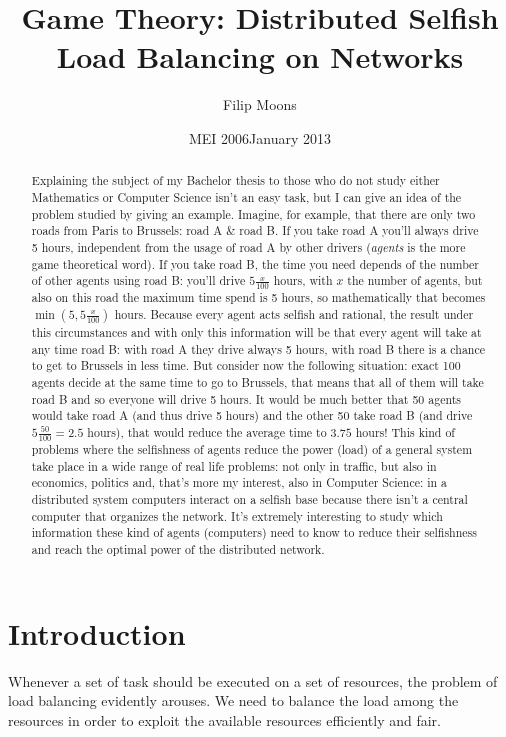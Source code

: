 \documentclass[a4paper,11pt]{article}
\author{Filip Moons}
\title{Game Theory: Distributed Selfish Load Balancing on Networks}
\date{MEI 2006}
\date{January 2013}
\begin{document}
\maketitlepage
\newpage
\null\vspace{\fill}

\begin{abstract}
Explaining the subject of my Bachelor thesis to those who do not study either Mathematics or Computer Science isn't an easy task, but I can give an idea of the problem studied by giving an example. Imagine, for example, that there are only two roads from Paris to Brussels: road A \& road B. If you take road A you'll always drive 5 hours, independent from the usage of road A by other drivers (\emph{agents} is the more game theoretical word). If you take road B, the time you need depends of the number of other agents using road B: you'll drive $5\frac{x}{100}$ hours, with $x$ the number of agents, but also on this road the maximum time spend is 5 hours, so mathematically that becomes $\min(5, 5\frac{x}{100})$ hours. Because every agent acts selfish and rational, the result under this circumstances and with only this information will be that every agent will take at any time road B: with road A they drive always 5 hours, with road B there is a chance to get to Brussels in less time. But consider now the following situation: exact 100 agents decide at the same time to go to Brussels, that means that all of them will take road B and so everyone will drive 5 hours. It would be much better that 50 agents would take road A (and thus drive 5 hours) and the other 50 take road B (and drive $5\frac{50}{100} = 2.5$ hours), that would reduce the average time to $3.75$ hours! This kind of problems where the selfishness of agents reduce the power (load) of a general system take place in a wide range of real life problems: not only in traffic, but also in economics, politics and, that's more my interest, also in Computer Science: in a distributed system computers interact on a selfish base because there isn't a central computer that organizes the network. It's extremely interesting to study which information these kind of agents (computers) need to know to reduce their selfishness and reach the optimal power of the distributed network.
\end{abstract}
\vspace{\fill}
\newpage

\tableofcontents

\section{Introduction}
Whenever a set of task should be executed on a set of resources, the problem of load balancing evidently arouses. We need to balance the load among the resources in order to exploit the available resources efficiently and fair.
\end{document}
